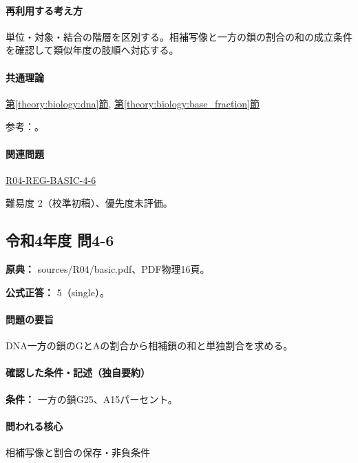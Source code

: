 \paragraph{再利用する考え方} 単位・対象・結合の階層を区別する。相補写像と一方の鎖の割合の和の成立条件を確認して類似年度の肢順へ対応する。

\paragraph{共通理論} \hyperref[theory:biology:dna]{第\ref*{theory:biology:dna}節}, \hyperref[theory:biology:base_fraction]{第\ref*{theory:biology:base_fraction}節}

\par 参考：\cite{nhgri_dna}。

\paragraph{関連問題} \hyperref[q:r04-reg-basic-4-6]{R04-REG-BASIC-4-6}

\par 難易度 2（校準初稿）、優先度未評価。

\subsection{令和4年度 問4-6}
\label{q:r04-reg-basic-4-6}

\noindent\textbf{原典：} sources/R04/basic.pdf、PDF物理16頁。

\textbf{公式正答：} 5（single）。

\paragraph{問題の要旨} DNA一方の鎖のGとAの割合から相補鎖の和と単独割合を求める。

\paragraph{確認した条件・記述（独自要約）}\mbox{}\par

\noindent\textbf{条件：} 一方の鎖G25、A15パーセント。\par

\paragraph{問われる核心} 相補写像と割合の保存・非負条件

